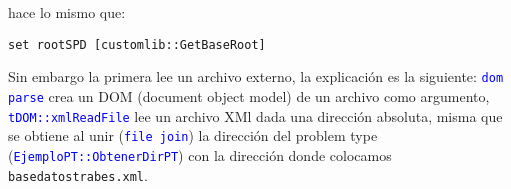 \documentclass[10pt, a4paper, twocolumn]{article} %
\begin{document}
hace lo mismo que:

\lstset{language=tcl} 
\begin{lstlisting}[caption={Obtener el nodo raíz del archivo \texttt{EjemploPT\_default.spd}.}]
	set rootSPD [customlib::GetBaseRoot]
\end{lstlisting}

Sin embargo la primera lee un archivo externo, la explicación es la siguiente: \textcolor{blue}{\texttt{dom parse}} crea un DOM (document object model) de un archivo como argumento, \textcolor{blue}{\texttt{tDOM::xmlReadFile}} lee un archivo XMl dada una dirección absoluta, misma que se obtiene al unir (\textcolor{blue}{\texttt{file join}}) la dirección del problem type (\textcolor{blue}{\texttt{EjemploPT::ObtenerDirPT}}) con la dirección donde colocamos \texttt{basedatostrabes.xml}.
\end{document}
